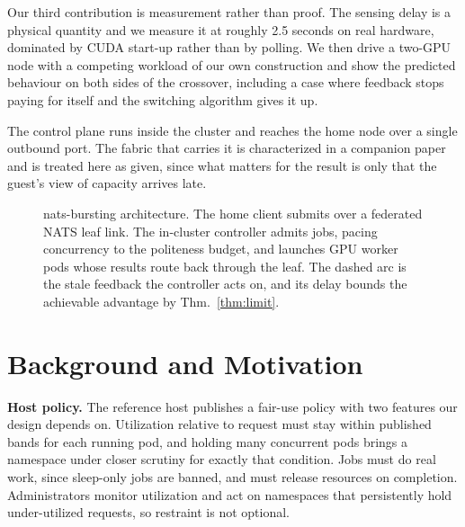 \documentclass[10pt,conference,letterpaper]{IEEEtran}
\theoremstyle{remark}\newtheorem{remark}{Remark}
\newif\ifblind
\newcommand{\sysname}{\ifblind PoliteBurst\else nats-bursting\fi}
\begin{document}
Our third contribution is measurement rather than proof. The sensing delay is a
physical quantity and we measure it at roughly 2.5 seconds on real hardware,
dominated by CUDA start-up rather than by polling. We then drive a two-GPU node with a
competing workload of our own construction and show the predicted behaviour on
both sides of the crossover, including a case where feedback stops paying for itself and the
switching algorithm gives it up.

The control plane runs inside the cluster and reaches the home node over a single
outbound port. The fabric that carries it is characterized in a companion
paper~\cite{companion} and is treated here as given, since what matters for the
result is only that the guest's view of capacity arrives late.

\begin{figure}[t]
\centering
{}
\caption{\sysname{} architecture. The home client submits over a federated NATS
leaf link. The in-cluster controller admits jobs, pacing concurrency to the
politeness budget, and launches GPU worker pods whose results route back through
the leaf. The dashed arc is the stale feedback the controller acts on, and its
delay bounds the achievable advantage by Thm.~\ref{thm:limit}.}
\label{fig:arch}
\end{figure}

\section{Background and Motivation}
\label{sec:bg}
\textbf{Host policy.} The reference host \cite{nautilus} publishes a fair-use
policy with two features our design depends on. Utilization relative to request
must stay within published bands for each running pod, and holding many
concurrent pods brings a namespace under closer scrutiny for exactly that
condition. Jobs must do real work, since sleep-only jobs are banned, and must
release resources on completion. Administrators monitor utilization and act on
namespaces that persistently hold under-utilized requests, so restraint is not
optional.
\end{document}
